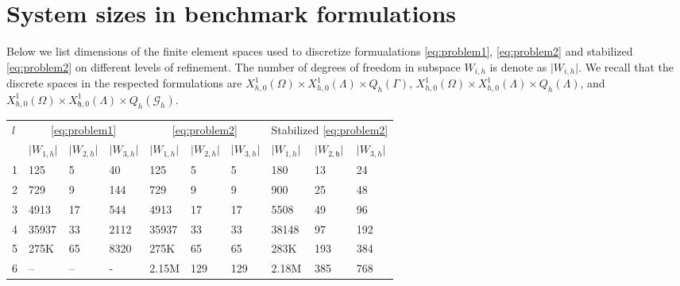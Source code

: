 \section{System sizes in benchmark formulations} \label{sec:appendix}
Below we list dimensions of the finite element spaces used to discretize
formualations \eqref{eq:problem1}, \eqref{eq:problem2} and stabilized
\eqref{eq:problem2} on different levels of refinement. The number of 
degrees of freedom in subspace $W_{i, h}$ is denote as $\lvert W_{i, h}\rvert$. 
We recall that the discrete spaces in the respected formulations 
are $X^1_{h, 0}(\Omega)\times X^1_{h, 0}(\Lambda)\times Q_h(\Gamma)$,
      $X^1_{h, 0}(\Omega)\times X^1_{h, 0}(\Lambda)\times Q_h(\Lambda)$,
      and 
      $X^1_{h, 0}(\Omega)\times X^1_{\mathfrak{h}, 0}(\Lambda)\times Q_h(\mathcal{G}_h)$.

\begin{center}
  \scriptsize{
    \begin{tabular}{l|lll|lll|lll}
      \hline
      \multirow{2}{*}{$l$} & \multicolumn{3}{c|}{\eqref{eq:problem1}} & \multicolumn{3}{c|}{\eqref{eq:problem2}} & \multicolumn{3}{c}{ Stabilized \eqref{eq:problem2}}\\
      \cline{2-10}
       & $\lvert W_{1, h}\rvert$  & $\lvert W_{2, h}\rvert$ & $\lvert W_{3, h}\rvert$ 
       & $\lvert W_{1, h}\rvert$  & $\lvert W_{2, h}\rvert$ & $\lvert W_{3, h}\rvert$
       & $\lvert W_{1, h}\rvert$  & $\lvert W_{2, \mathfrak{h}}\rvert$ & $\lvert W_{3, h}\rvert$\\
      \hline
     1& 125    & 5  & 40   & 125     & 5   & 5   & 180     & 13  & 24  \\
     2& 729    & 9  & 144  & 729     & 9   & 9   & 900     & 25  & 48  \\
     3& 4913   & 17 & 544  & 4913    & 17  & 17  & 5508    & 49  & 96  \\
     4& 35937  & 33 & 2112 & 35937   & 33  & 33  & 38148   & 97  & 192 \\
     5& 275K & 65 & 8320 & 275K  & 65  & 65  & 283K  & 193 & 384 \\
     6& --     & -- & -    & 2.15M & 129 & 129 & 2.18M & 385 & 768 \\
     \hline
    \end{tabular}
    }
\end{center}
